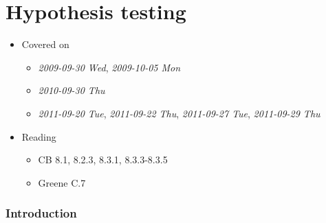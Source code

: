
\part{Hypothesis testing}

\begin{itemize}
\item Covered on
\begin{itemize}
\item \textit{2009-09-30 Wed}, \textit{2009-10-05 Mon}
\item \textit{2010-09-30 Thu}
\item \textit{2011-09-20 Tue}, \textit{2011-09-22 Thu}, \textit{2011-09-27 Tue},
       \textit{2011-09-29 Thu}
\end{itemize}
\item Reading
\begin{itemize}
\item CB 8.1, 8.2.3, 8.3.1, 8.3.3-8.3.5
\item Greene C.7
\end{itemize}
\end{itemize}
\section{Introduction}
\label{sec-1}

